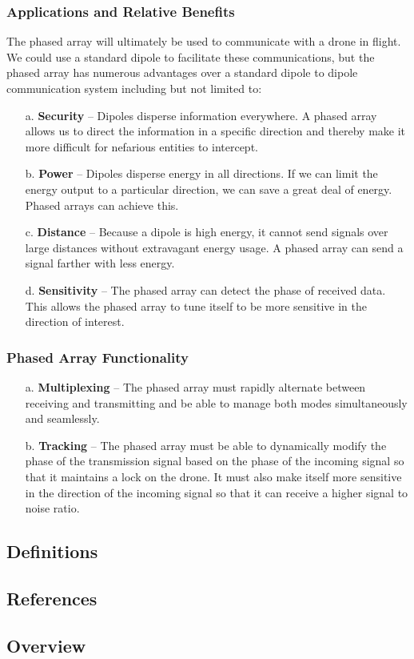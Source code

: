 \documentclass[ProjectRequirements.tex]{subfiles}
\begin{document}
		\subsubsection{Applications and Relative Benefits}
			The phased array will ultimately be used to communicate with a drone in flight. We could use a standard dipole to facilitate these communications, but the phased array has numerous advantages over a standard dipole to dipole communication system including but not limited to:
			\begin{itemize} \itemsep1pt
				\item[a.]	\textbf{Security} -- Dipoles disperse information everywhere. A phased array allows us to direct the information in a specific direction and thereby make it more difficult for nefarious entities to intercept.
				\item[b.] 	\textbf{Power} -- Dipoles disperse energy in all directions. If we can limit the energy output to a particular direction, we can save a great deal of energy. Phased arrays can achieve this.
				\item[c.] 	\textbf{Distance} -- Because a dipole is high energy, it cannot send signals over large distances without extravagant energy usage. A phased array can send a signal farther with less energy.
 				\item[d.] 	\textbf{Sensitivity} -- The phased array can detect the phase of received data. This allows the phased array to tune itself to be more sensitive in the direction of interest.
			\end{itemize}
		\subsubsection{Phased Array Functionality}
			\begin{itemize} \itemsep-1pt
				\item[a.]	\textbf{Multiplexing} -- The phased array must rapidly alternate between receiving and transmitting and be able to manage both modes simultaneously and seamlessly.
				\item[b.] 	\textbf{Tracking} -- The phased array must be able to dynamically modify the phase of the transmission signal based on the phase of the incoming signal so that it maintains a lock on the drone. It must also make itself more sensitive in the direction of the incoming signal so that it can receive a higher signal to noise ratio.
			\end{itemize}
	\subsection{Definitions}
	\subsection{References}
	\subsection{Overview}
\end{document}

